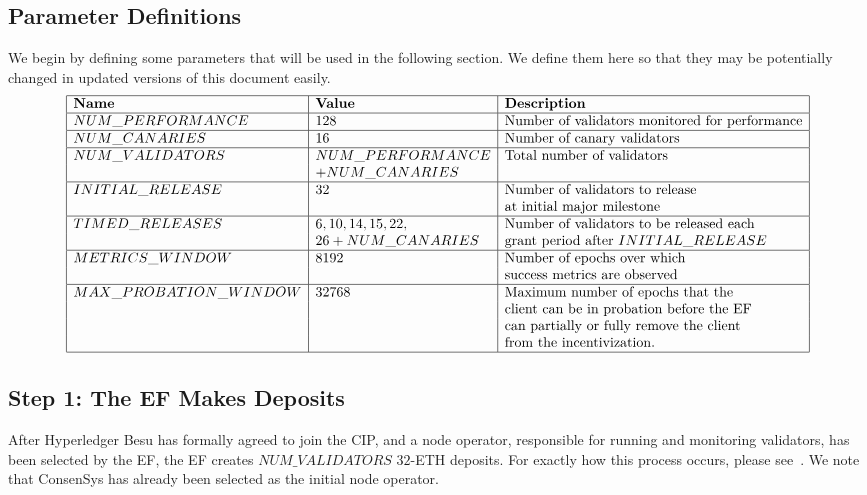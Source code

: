 \subsection{Parameter Definitions}
We begin by defining some parameters that will be used in the following section.  We define them here so that they may be potentially changed in updated versions of this document easily.
\[
\begin{array}{|l|l|l|}
\hline
\textbf{Name} & \textbf{Value} & \textbf{Description} \\
\hline
NUM\_PERFORMANCE & 128 & \text{Number of validators monitored for performance} \\
\hline
NUM\_CANARIES & 16 & \text{Number of canary validators} \\
\hline
NUM\_VALIDATORS & NUM\_PERFORMANCE & \text{Total number of validators} \\
&  + NUM\_CANARIES & \\
\hline
INITIAL\_RELEASE & 32 & \text{Number of validators to release} \\
& &  \text{at initial major milestone} \\
\hline
TIMED\_RELEASES & 6, 10, 14, 15, 22, & \text{Number of validators to be released each} \\
& 26 + NUM\_CANARIES & \text{grant period after } INITIAL\_RELEASE \\
\hline
METRICS\_WINDOW & 8192 & \text{Number of epochs over which} \\
& & \text{success metrics are observed} \\
\hline
MAX\_PROBATION\_WINDOW & 32768 & \text{Maximum number of epochs that the} \\
& & \text{client can be in probation before the EF} \\
& & \text{can partially or fully remove the client} \\
& & \text{from the incentivization.} \\
\hline
\end{array}
\]

\subsection{Step 1:  The EF Makes Deposits}
After Hyperledger Besu has formally agreed to join the CIP, and a node operator, responsible for running and monitoring validators, has been selected by the EF, the EF creates $NUM\_VALIDATORS$ $32$-ETH deposits.  For exactly how this process occurs, please see~\cite{EthVal}.  We note that ConsenSys has already been selected as the initial node operator.


